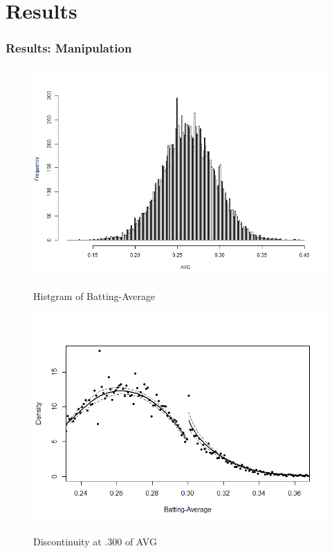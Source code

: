 \documentclass[dvipdfmx,12pt]{beamer}
\begin{document}
\section{Results}
\begin{frame}\frametitle{Results: Manipulation}
  \begin{figure}
    \centering
    \caption{Histgram of Batting-Average}        \includegraphics[keepaspectratio, scale = 0.35, angle=0]{graphs/hist_AVG_all.png}
    \label{AVG_Histgram}
  \end{figure}

\end{frame}

\begin{frame}
  \begin{figure}
    \centering
    \caption{Discontinuity at .300 of AVG}
    \includegraphics[keepaspectratio, scale = 0.5, angle = 0]{graphs/AVG_300.png}
    \label{DCdensity_AVG_300}

  \end{figure}
\end{frame}
\end{document}
